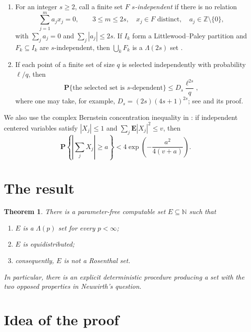 \documentclass[11pt]{amsart}
\newcommand{\E}{\mathbf E}
\newcommand{\Pp}{\mathbf P}
\newcommand{\N}{\mathbb N}
\newcommand{\Z}{\mathbb Z}
\newcommand{\1}{\mathbf 1}
\newtheorem{theorem}{Theorem}
\theoremstyle{definition}
\theoremstyle{remark}
\begin{document}
\begin{enumerate}[label=(N\arabic*)]
\item\label{N1}
For an integer $s\ge2$, call a finite set $F$ \emph{$s$-independent} if
there is no relation
\[
 \sum_{j=1}^m a_jx_j=0,\qquad
 3\le m\le2s,\quad x_j\in F\text{ distinct},\quad
 a_j\in\Z\setminus\{0\},
\]
with $\sum_j a_j=0$ and $\sum_j|a_j|\le2s$.
If $I_k$ form a Littlewood--Paley partition and $F_k\subseteq I_k$ are
$s$-independent, then $\bigcup_kF_k$ is a $\Lambda(2s)$ set
\cite[Proposition 5.4]{Neuwirth}.

\item\label{N2}
If each point of a finite set of size $q$ is selected independently with
probability $\ell/q$, then
\begin{equation}\label{eq:indprob}
 \Pp\{\text{the selected set is $s$-dependent}\}
 \le D_s\frac{\ell^{2s}}q,
\end{equation}
where one may take, for example,
$D_s=(2s)(4s+1)^{2s}$; see \cite[Lemma 5.5]{Neuwirth} and its proof.
\end{enumerate}

We also use the complex Bernstein concentration inequality in
\cite[Lemma 6.1]{Neuwirth}: if independent centered variables satisfy
$|X_j|\le1$ and $\sum_j\E|X_j|^2\le v$, then
\begin{equation}\label{eq:bernstein}
 \Pp\left\{\left|\sum_jX_j\right|\ge a\right\}
 <4\exp\left(-\frac{a^2}{4(v+a)}\right).
\end{equation}

\section*{The result}

\begin{theorem}\label{thm:main}
There is a parameter-free computable set $E\subseteq\N$ such that
\begin{enumerate}[label=\textup{(\roman*)}]
\item $E$ is a $\Lambda(p)$ set for every $p<\infty$;
\item $E$ is equidistributed;
\item consequently, $E$ is not a Rosenthal set.
\end{enumerate}
In particular, there is an explicit deterministic procedure producing a set
with the two opposed properties in Neuwirth's question.
\end{theorem}

\section*{Idea of the proof}
\end{document}
